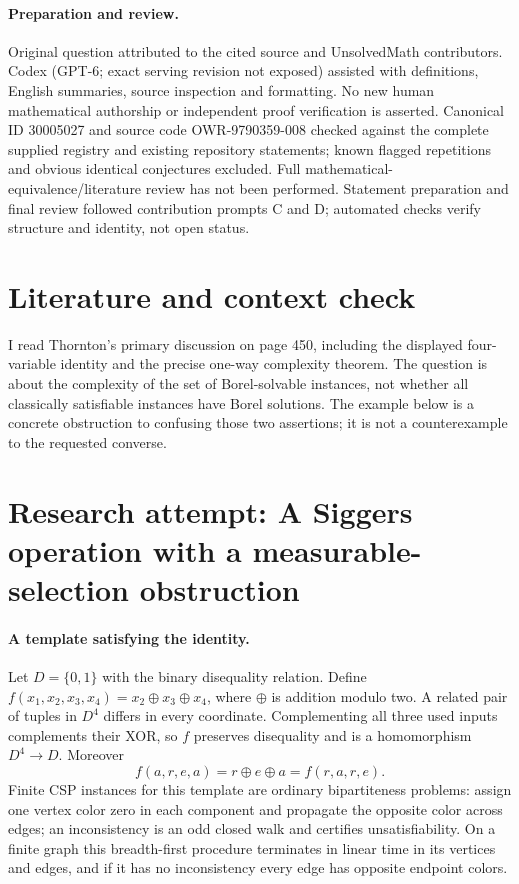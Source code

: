 \documentclass[11pt]{article}
\begin{document}
\paragraph{Preparation and review.}
Original question attributed to the cited source and UnsolvedMath contributors. Codex (GPT-6; exact serving revision not exposed) assisted with definitions, English summaries, source inspection and formatting. No new human mathematical authorship or independent proof verification is asserted. Canonical ID 30005027 and source code OWR-9790359-008 checked against the complete supplied registry and existing repository statements; known flagged repetitions and obvious identical conjectures excluded. Full mathematical-equivalence/literature review has not been performed. Statement preparation and final review followed contribution prompts C and D; automated checks verify structure and identity, not open status.
\label{end:30005027}

\section{Literature and context check}

I read Thornton's primary discussion on page 450, including the displayed
four-variable identity and the precise one-way complexity theorem. The question
is about the complexity of the set of Borel-solvable instances, not whether all
classically satisfiable instances have Borel solutions. The example below is a
concrete obstruction to confusing those two assertions; it is not a
counterexample to the requested converse.

\section{Research attempt: A Siggers operation with a measurable-selection obstruction}

\paragraph{A template satisfying the identity.}
Let $D=\{0,1\}$ with the binary disequality relation. Define
$f(x_1,x_2,x_3,x_4)=x_2\mathbin\oplus x_3\mathbin\oplus x_4$, where
$\oplus$ is addition modulo two.
A related pair of tuples in $D^4$ differs in every coordinate. Complementing
all three used inputs complements their XOR, so $f$ preserves disequality
and is a homomorphism $D^4\to D$.
Moreover
\[
 f(a,r,e,a)=r\oplus e\oplus a=f(r,a,r,e).
\]
Finite CSP instances for this template are ordinary bipartiteness problems:
assign one vertex color zero in each component and propagate the opposite
color across edges; an inconsistency is an odd closed walk and certifies
unsatisfiability. On a finite graph this breadth-first procedure terminates in
linear time in its vertices and edges, and if it has no inconsistency every
edge has opposite endpoint colors.
\end{document}
